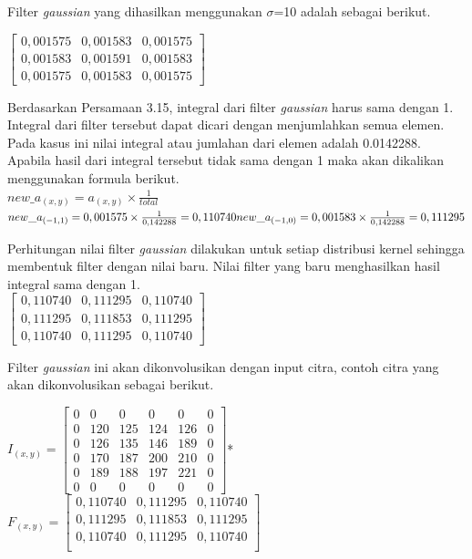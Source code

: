\noindent Filter \emph{gaussian} yang dihasilkan menggunakan $\sigma$=10 adalah sebagai berikut.

\noindent
$\left[
\begin{matrix}
	0,001575 & 0,001583 & 0,001575
	 \\
	0,001583 & 0,001591 & 0,001583
	\\
	0,001575 & 0,001583 & 0,001575
\end{matrix}
\right]$

\noindent Berdasarkan Persamaan 3.15, integral dari filter \emph{gaussian} harus sama dengan 1. Integral dari filter tersebut dapat dicari dengan menjumlahkan semua elemen. Pada kasus ini nilai integral atau jumlahan dari elemen adalah 0.0142288. Apabila hasil dari integral tersebut tidak sama dengan 1 maka akan dikalikan menggunakan formula berikut.\\
$
new\_a_{(x,y)}=a_{(x,y)}\times\frac{1}{total}
$\\
$
new\_a_{(-1,1)}=0,001575\times\frac{1}{0,142288}=0,110740\\
new\_a_{(-1,0)}=0,001583\times\frac{1}{0,142288}=0,111295
$

\noindent Perhitungan nilai filter \emph{gaussian} dilakukan untuk setiap distribusi kernel sehingga membentuk filter dengan nilai baru. Nilai filter yang baru menghasilkan hasil integral sama dengan 1.\\

\noindent
$\left[
\begin{matrix}
0,110740&0,111295&0,110740\\
0,111295&0,111853&0,111295\\
0,110740&0,111295&0,110740
\end{matrix}
\right]$

\noindent Filter \emph{gaussian} ini akan dikonvolusikan dengan input citra, contoh citra yang akan dikonvolusikan sebagai berikut.

\noindent
$I_{(x,y)}=\left[
\begin{matrix}
0&0&0&0&0&0\\
0&120&	125&	124&	126&0\\
0&126&	135&	146&	189&0\\
0&170&	187&	200&	210&0\\
0&189&	188&	197&	221&0\\
0&0&0&0&0&0
\end{matrix}
\right]$*
$F_{(x,y)}=\left[
\begin{matrix}
0,110740 &0,111295&0,110740\\
0,111295&0,111853&0,111295\\
0,110740&0,111295&0,110740\\
\end{matrix}
\right]$

